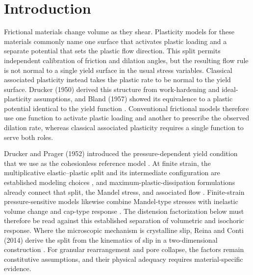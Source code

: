 \documentclass[11pt]{article}
\begin{document}
\section{Introduction}
\label{sec:introduction}

Frictional materials change volume as they shear. Plasticity models for these
materials commonly name one surface that activates plastic loading and a
separate potential that sets the plastic flow direction.  This split permits
independent calibration of friction and dilation angles, but the resulting flow
rule is not normal to a single yield surface in the usual stress variables.
Classical associated plasticity instead takes
the plastic rate to be normal to the yield surface.  Drucker (1950) derived this
structure from work-hardening and ideal-plasticity assumptions, and Bland (1957)
showed its equivalence to a plastic potential identical to the yield function
\cite{drucker1950,bland1957}.  Conventional frictional models therefore use one
function to activate plastic loading and another to prescribe the observed
dilation rate, whereas classical associated plasticity requires a single
function to serve both roles.

Drucker and Prager (1952) introduced the pressure-dependent yield condition that
we use as the cohesionless reference model \cite{druckerprager1952}.  At finite strain,
the multiplicative elastic--plastic split and its intermediate configuration
are established modeling choices \cite{lee1969}, and maximum-plastic-dissipation
formulations already connect that split, the Mandel stress, and associated flow
\cite{simo1988}.  Finite-strain pressure-sensitive models likewise combine
Mandel-type stresses with inelastic volume change and cap-type response
\cite{bennett2019}.  The distension factorization below must therefore be read
against this established separation of volumetric and isochoric response. Where
the microscopic mechanism is crystalline slip, Reina and Conti (2014) derive
the split from the kinematics of slip in a two-dimensional construction
\cite[Secs.~4 and 6]{reina2014}. For granular rearrangement and pore collapse,
the factors remain constitutive assumptions, and their physical adequacy
requires material-specific evidence.
\end{document}
